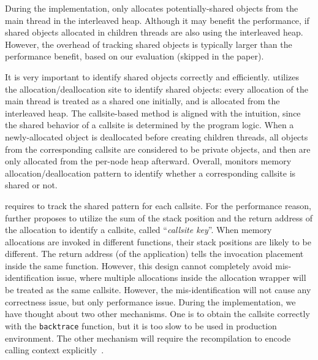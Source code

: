 During the implementation, \NA{} only allocates potentially-shared objects from the main thread in the interleaved heap. Although it may benefit the performance, if shared objects allocated in children threads are also using the interleaved heap. However, the overhead of tracking shared objects is typically larger than the performance benefit, based on our evaluation (skipped in the paper). 

It is very important to identify shared objects correctly and efficiently. \NA{} utilizes the allocation/deallocation site to identify shared objects: every allocation of the main thread is treated as a shared one initially, and is allocated from the interleaved heap. The callsite-based method is aligned with the intuition, since the shared behavior of a callsite is determined by the program logic. When a newly-allocated object is deallocated before creating children threads, all objects from the corresponding callsite are considered to be private objects, and then are only allocated from the per-node heap afterward. Overall, \NM{} monitors memory allocation/deallocation pattern to identify whether a corresponding callsite is shared or not. 

\NM{} requires to track the shared pattern for each callsite. For the performance reason, \NA{} further proposes to utilize the sum of the stack position and the return address of the allocation to identify a callsite, called ``\textit{callsite key}''. 
  When memory allocations are invoked in different functions, their stack positions are likely to be different. The return address (of the application) tells the invocation placement inside the same function. However, this design cannot completely avoid mis-identification issue,  where multiple allocations inside the allocation wrapper will be treated as the same callsite. However, the mis-identification will not cause any correctness issue, but only performance issue. During the implementation, we have thought about two other mechanisms. One is to obtain the callsite correctly with the \texttt{backtrace} function, but it is too slow to be used in production environment. The other mechanism will require the recompilation to encode calling context explicitly~\cite{DBLP:conf/icse/SumnerZWZ10, DBLP:conf/cgo/ZengR0AJ014}.
  
